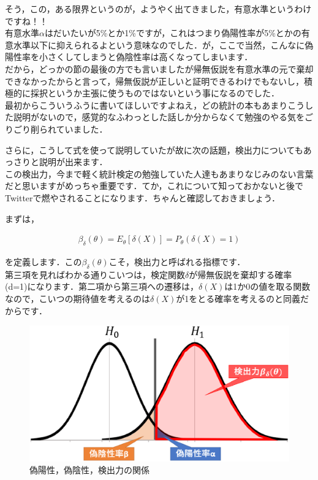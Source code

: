 \documentclass[11pt,a4paper,uplatex]{ujreport} 	%
\begin{document}
そう，この，ある限界というのが，ようやく出てきました，有意水準というわけですね！！\\

有意水準$\alpha$はだいたいが5\%とか1\%ですが，これはつまり偽陽性率が5\%とかの有意水準以下に抑えられるよという意味なのでした．が，ここで当然，こんなに偽陽性率を小さくしてしまうと偽陰性率は高くなってしまいます．\\

だから，どっかの節の最後の方でも言いましたが帰無仮説を有意水準の元で棄却できなかったからと言って，帰無仮説が正しいと証明できるわけでもないし，積極的に採択というか主張に使うものではないという事になるのでした．\\

最初からこういうふうに書いてほしいですよねえ，どの統計の本もあまりこうした説明がないので，感覚的なふわっとした話しか分からなくて勉強のやる気をごりごり削られていました．

さらに，こうして式を使って説明していたが故に次の話題，検出力についてもあっさりと説明が出来ます．\\

この検出力，今まで軽く統計検定の勉強していた人達もあまりなじみのない言葉だと思いますがめっちゃ重要です．てか，これについて知っておかないと後でTwitterで燃やされることになります．ちゃんと確認しておきましょう．

まずは，

\begin{align}
  \beta_\delta(\theta) = E_\theta[\delta(X)] = P_\theta(\delta(X)=1)
\end{align}

を定義します．この$\beta_\delta(\theta)$こそ，検出力と呼ばれる指標です．\\

第三項を見ればわかる通りこいつは，検定関数$\delta$が帰無仮説を棄却する確率(d=1)になります．第二項から第三項への遷移は，$\delta(X)$は1か0の値を取る関数なので，こいつの期待値を考えるのは$\delta(X)$が1をとる確率を考えるのと同義だからです．\\

\begin{figure}[H]
  \label{im:power}
  \includegraphics[width=15cm]{../figures/power-dist.eps}
  \caption{偽陽性，偽陰性，検出力の関係}
\end{figure}
\end{document}

